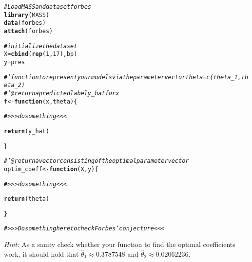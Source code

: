 \documentclass[a4paper]{article}
\makeatletter
\newcommand{\hlnum}[1]{\textcolor[rgb]{0.686,0.059,0.569}{#1}}%
\newcommand{\hlcom}[1]{\textcolor[rgb]{0.678,0.584,0.686}{\textit{#1}}}%
\newcommand{\hlstd}[1]{\textcolor[rgb]{0.345,0.345,0.345}{#1}}%
\newcommand{\hlkwa}[1]{\textcolor[rgb]{0.161,0.373,0.58}{\textbf{#1}}}%
\newcommand{\hlkwb}[1]{\textcolor[rgb]{0.69,0.353,0.396}{#1}}%
\newcommand{\hlkwc}[1]{\textcolor[rgb]{0.333,0.667,0.333}{#1}}%
\newcommand{\hlkwd}[1]{\textcolor[rgb]{0.737,0.353,0.396}{\textbf{#1}}}%
\newenvironment{kframe}{%
 \def\at@end@of@kframe{}%
 \ifinner\ifhmode%
  \def\at@end@of@kframe{\end{minipage}}%
  \begin{minipage}{\columnwidth}%
 \fi\fi%
 \def\FrameCommand##1{\hskip\@totalleftmargin \hskip-\fboxsep
 \colorbox{shadecolor}{##1}\hskip-\fboxsep
     \hskip-\linewidth \hskip-\@totalleftmargin \hskip\columnwidth}%
 \MakeFramed {\advance\hsize-\width
   \@totalleftmargin\z@ \linewidth\hsize
   \@setminipage}}%
 {\par\unskip\endMakeFramed%
 \at@end@of@kframe}
\newenvironment{knitrout}{}{} %
\newcommand{\exexams}
  {\color{black} \hrule \section{Further exercises}}
\newcommand{\exinspo}
  {\color{black} \hrule \section{Ideas \& exercises from other sources}}
\makeatother
\begin{document}
{\begin{enumerate}
\begin{itemize}
\begin{knitrout}
\begin{kframe}
\begin{alltt}
\hlcom{# Load MASS and data set forbes}
\hlkwd{library}\hlstd{(MASS)}
\hlkwd{data}\hlstd{(forbes)}
\hlkwd{attach}\hlstd{(forbes)}

\hlcom{# initialize the data set}
\hlstd{X} \hlkwb{=} \hlkwd{cbind}\hlstd{(}\hlkwd{rep}\hlstd{(}\hlnum{1}\hlstd{,}\hlnum{17}\hlstd{),bp)}
\hlstd{y} \hlkwb{=} \hlstd{pres}

\hlcom{#' function to represent your models via the parameter vector theta = c(theta_1, theta_2)}
\hlcom{#' @return a predicted label y_hat for x}
\hlstd{f} \hlkwb{<-} \hlkwa{function}\hlstd{(}\hlkwc{x}\hlstd{,} \hlkwc{theta}\hlstd{)\{}

  \hlcom{# >>> do something <<<}

  \hlkwd{return}\hlstd{(y_hat)}

\hlstd{\}}

\hlcom{#' @return a vector consisting of the optimal  parameter vector }
\hlstd{optim_coeff} \hlkwb{<-} \hlkwa{function}\hlstd{(}\hlkwc{X}\hlstd{,}\hlkwc{y}\hlstd{)\{}

  \hlcom{# >>> do something <<<}

  \hlkwd{return}\hlstd{(theta)}

\hlstd{\}}

  \hlcom{# >>>  Do something here to check Forbes' conjecture <<<}
\end{alltt}
\end{kframe}
\end{knitrout}
%
	\emph{Hint:} As a sanity check whether your function to find the optimal coefficients work, it should hold that $\hat\theta_1 \approx 0.3787548$ 	and $\hat\theta_2 \approx 0.02062236.$
	\end{itemize}
%
\end{enumerate}
}


% 
% 
% 
\end{document}
